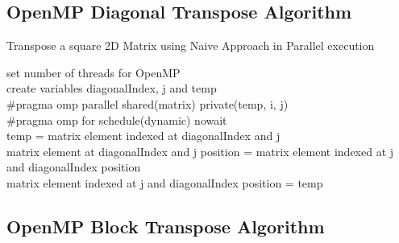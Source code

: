 \documentclass[10pt,onecolumn]{article}
\begin{document}
\subsection{OpenMP Diagonal Transpose Algorithm}
%
\begin{algorithm}[H]
    \caption{Transpose a square 2D Matrix using Naive Approach in Parallel execution}
    set number of threads for OpenMP\\
    create variables diagonalIndex, j and temp\\
    \#pragma omp parallel shared(matrix) private(temp, i, j)\\
    \#pragma omp for schedule(dynamic) nowait\\
    {
        {
            temp = matrix element indexed at diagonalIndex and j \\
            matrix element at diagonalIndex and j position = matrix element indexed at j and diagonalIndex position \\
            matrix element indexed at j and diagonalIndex position = temp
        }
    }
\end{algorithm}
%
\subsection{OpenMP Block Transpose Algorithm}
%

%
\end{document}
